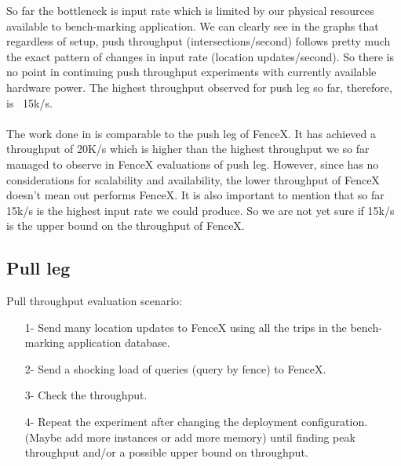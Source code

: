 \documentclass[a4]{report}
\begin{document}
    So far the bottleneck is input rate which is limited by our physical resources available to bench-marking
    application.
    We can clearly see in the graphs that regardless of setup, push throughput (intersections/second) follows pretty
    much the exact pattern of changes in input rate (location updates/second).
    So there is no point in continuing push throughput experiments with currently available hardware power.
    The highest throughput observed for push leg so far, therefore, is ~15k/s.

    \paragraph{}
    The work done in \cite{Nechifor_Comnac_2013} is comparable to the push leg of FenceX.
    It has achieved a throughput of 20K/s which is higher than the highest throughput we so far managed to observe in
    FenceX evaluations of push leg.
    However, since \cite{Nechifor_Comnac_2013} has no considerations for scalability and availability, the lower
    throughput of FenceX doesn't mean \cite{Nechifor_Comnac_2013} out performs FenceX.
    It is also important to mention that so far 15k/s is the highest input rate we could produce.
    So we are not yet sure if 15k/s is the upper bound on the throughput of FenceX.

    \subsection{Pull leg}
    Pull throughput evaluation scenario:
    \begin{itemize}
        \item[1-] Send many location updates to FenceX using all the trips in the bench-marking application database.
        \item[2-] Send a shocking load of queries (query by fence) to FenceX.
        \item[3-] Check the throughput.
        \item[4-] Repeat the experiment after changing the deployment configuration. (Maybe add more instances or add
        more memory) until finding peak throughput and/or a possible upper bound on throughput.
    \end{itemize}
\end{document}
